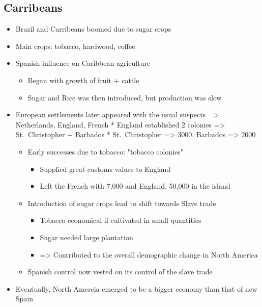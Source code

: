 \documentclass[letterpaper]{article}
\begin{document}
\subsection{Carribeans}
\label{sec:org18fec93}
\begin{itemize}
\item Brazil and Carribeans boomed due to sugar crops
\item Main crops: tobacco, hardwood, coffee
\item Spanish influence on Caribbean agriculture

\begin{itemize}
\item Began with growth of fruit + cattle
\item Sugar and Rice was then introduced, but production was slow
\end{itemize}

\item European settlements later appeared with the usual suspects =>
Netherlands, England, French * England established 2 colonies =>
St. Christopher + Barbados * St. Christopher => 3000, Barbados => 2000

\begin{itemize}
\item Early successes due to tobacco: "tobacco colonies"

\begin{itemize}
\item Supplied great customs values to England
\item Left the French with 7,000 and England, 50,000 in the island
\end{itemize}

\item Introduction of sugar crops lead to shift towards Slave trade

\begin{itemize}
\item Tobacco economical if cultivated in small quantities
\item Sugar needed large plantation
\item => Contributed to the overall demographic change in North America
\end{itemize}

\item Spanish control now vested on its control of the slave trade
\end{itemize}

\item Eventually, North Amercia emerged to be a bigger economy than that of
new Spain
\end{itemize}
\end{document}
